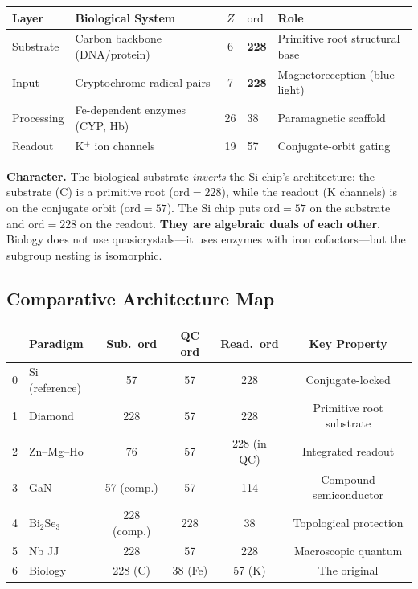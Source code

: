 \begin{center}
\begin{tabular}{@{}llcll@{}}
\toprule
\textbf{Layer} & \textbf{Biological System} & $Z$ & $\mathrm{ord}$ & \textbf{Role} \\
\midrule
Substrate & Carbon backbone (DNA/protein) & 6 & \textbf{228} & Primitive root structural base \\
Input & Cryptochrome radical pairs & 7 & \textbf{228} & Magnetoreception (blue light) \\
Processing & Fe-dependent enzymes (CYP, Hb) & 26 & 38 & Paramagnetic scaffold \\
Readout & K$^+$ ion channels & 19 & 57 & Conjugate-orbit gating \\
\bottomrule
\end{tabular}
\end{center}

\noindent \textbf{Character.} The biological substrate \emph{inverts} the Si chip's architecture: the substrate (C) is a primitive root ($\mathrm{ord} = 228$), while the readout (K channels) is on the conjugate orbit ($\mathrm{ord} = 57$). The Si chip puts $\mathrm{ord} = 57$ on the substrate and $\mathrm{ord} = 228$ on the readout. \textbf{They are algebraic duals of each other}. Biology does not use quasicrystals---it uses enzymes with iron cofactors---but the subgroup nesting is isomorphic.

\subsection{Comparative Architecture Map}

\begin{center}
{\small
\begin{tabular}{@{}rlcccc@{}}
\toprule
& \textbf{Paradigm} & \textbf{Sub.\ ord} & \textbf{QC ord} & \textbf{Read.\ ord} & \textbf{Key Property} \\
\midrule
0 & Si (reference) & 57 & 57 & 228 & Conjugate-locked \\
1 & Diamond & 228 & 57 & 228 & Primitive root substrate \\
2 & Zn--Mg--Ho & 76 & 57 & 228 (in QC) & Integrated readout \\
3 & GaN & 57 (comp.) & 57 & 114 & Compound semiconductor \\
4 & Bi$_2$Se$_3$ & 228 (comp.) & 228 & 38 & Topological protection \\
5 & Nb JJ & 228 & 57 & 228 & Macroscopic quantum \\
6 & Biology & 228 (C) & 38 (Fe) & 57 (K) & The original \\
\bottomrule
\end{tabular}
}
\end{center}

